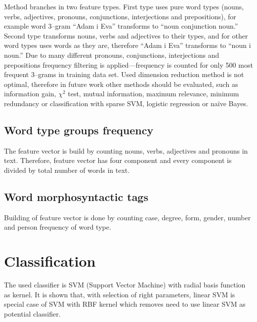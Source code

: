 \documentclass[11pt,english]{article}
\begin{document}
\begin{multicols}{2}
Method branches in two feature types. First type uses pure word types (nouns,
verbs, adjectives, pronouns, conjunctions, interjections and prepositions), for
example word 3--gram ``Adam i Eva'' transforms to ``noun conjunction noun.''
Second type transforms nouns, verbs and adjectives to their types, and for other
word types uses words as they are, therefore ``Adam i Eva'' transforms to
``noun i noun.'' Due to many different pronouns, conjunctions, interjections and
prepositions frequency filtering is applied---frequency is counted for only 500
most frequent 3--grams in training data set. Used dimension reduction method is
not optimal, therefore in future work other methods should be evaluated, such as
information gain, $\chi^2$ test, mutual information, maximum relevance, minimum
redundancy or classification with sparse SVM, logistic regression or na\"ive
Bayes.

\subsection{Word type groups frequency}
\label{sec:grupe-tipova}
The feature vector is build by counting nouns, verbs, adjectives and pronouns in
text. Therefore, feature vector has four component and every component is divided
by total number of words in text.

\subsection{Word morphosyntactic tags}
\label{sec:morphosyntactic}
Building of feature vector is done by counting case, degree, form,
gender, number and person frequency of word type.

\section{Classification}

The used classifier is SVM (Support Vector Machine) with radial basis
function as kernel. It is shown that, with selection of right parameters, linear
SVM is special case of SVM with RBF kernel \citep{keerthi2003asymptotic} which
removes need to use linear SVM as potential classifier.


\end{multicols}
\end{document}
